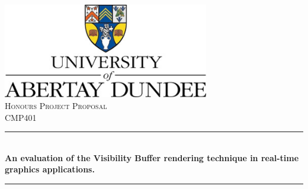 



\begin{titlepage}

\newcommand{\HRule}{\rule{\linewidth}{0.5mm}} %

\center %
 


\includegraphics[width=9cm,keepaspectratio]{abertay_logo.jpeg}\\[2cm] %

\textsc{\Large Honours Project Proposal}\\[0.5cm] %
\textsc{\large CMP401}\\[0.5cm] %


\HRule \\[0.4cm]
{ \huge \bfseries An evaluation of the Visibility Buffer rendering technique in
real-time graphics applications.}\\[0.4cm] %
\HRule \\[1.5cm]
 

\end{titlepage}
